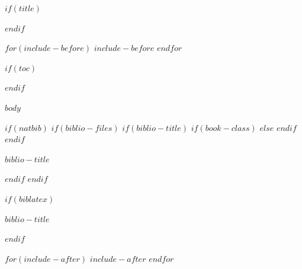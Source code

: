 \documentclass[compress,ignorenonframetext,
							 $for(classoption)$$classoption$$sep$,$endfor$]{$documentclass$}
\date{$date$}
\begin{document}
$if(title)$
\begin{frame}[plain]
	\titlepage
\end{frame}
$endif$

$for(include-before)$
	$include-before$
$endfor$

$if(toc)$
	\begin{frame}
		\tableofcontents[hideallsubsections]
	\end{frame}
$endif$

$body$

$if(natbib)$
	$if(biblio-files)$
		$if(biblio-title)$
			$if(book-class)$
				\renewcommand\bibname{$biblio-title$}
			$else$
				\renewcommand\refname{$biblio-title$}
			$endif$
		$endif$
			\begin{frame}[allowframebreaks]{$biblio-title$}
				
			\end{frame}
	$endif$
$endif$

$if(biblatex)$
	\begin{frame}[allowframebreaks]{$biblio-title$}
		\printbibliography[heading=none]
	\end{frame}
$endif$

$for(include-after)$
	$include-after$
$endfor$
\end{document}
